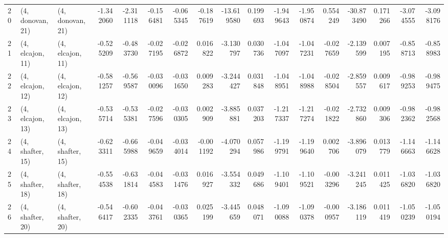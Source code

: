 \begin{tabular}{lllrrrrrrrrrrrrrr}
20 &  (4, donovan, 21) &  (4, donovan, 21) & -1.342060 & -2.311118 &  -0.156481 & -0.065345 & -0.187619 & -13.619580 &  0.199693 &  -1.949643 & -1.950874 &  0.554249 & -30.873490 &  0.171266 & -3.074555 & -3.098176 \\
21 &  (4, elcajon, 11) &  (4, elcajon, 11) & -0.525209 & -0.483730 &  -0.027195 & -0.026872 &  0.016822 &  -3.130797 &  0.030736 &  -1.047097 & -1.047231 & -0.027659 &  -2.139599 &  0.007195 & -0.858713 & -0.858983 \\
22 &  (4, elcajon, 12) &  (4, elcajon, 12) & -0.581257 & -0.569587 &  -0.030096 & -0.031650 &  0.009283 &  -3.244427 &  0.031848 &  -1.048951 & -1.048988 & -0.028504 &  -2.859557 &  0.009617 & -0.989253 & -0.989475 \\
23 &  (4, elcajon, 13) &  (4, elcajon, 13) & -0.535714 & -0.535381 &  -0.027596 & -0.030305 &  0.002909 &  -3.885881 &  0.037203 &  -1.217337 & -1.217274 & -0.021822 &  -2.732860 &  0.009306 & -0.982362 & -0.982568 \\
24 &  (4, shafter, 15) &  (4, shafter, 15) & -0.623311 & -0.665988 &  -0.049659 & -0.034014 & -0.001192 &  -4.070294 &  0.057986 &  -1.199791 & -1.199640 &  0.002706 &  -3.896079 &  0.013779 & -1.146663 & -1.146628 \\
25 &  (4, shafter, 18) &  (4, shafter, 18) & -0.554538 & -0.631814 &  -0.044583 & -0.031476 &  0.016927 &  -3.554332 &  0.049686 &  -1.109401 & -1.109521 & -0.003296 &  -3.241245 &  0.011425 & -1.036820 & -1.036820 \\
26 &  (4, shafter, 20) &  (4, shafter, 20) & -0.546417 & -0.602335 &  -0.043761 & -0.030365 &  0.025199 &  -3.445659 &  0.048071 &  -1.090088 & -1.090378 & -0.000957 &  -3.186119 &  0.011419 & -1.050239 & -1.050194 \\
\bottomrule
\end{tabular}
